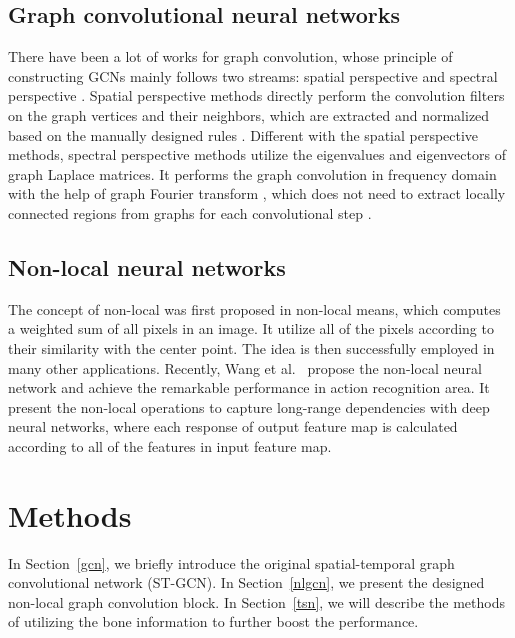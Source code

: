 \documentclass[10pt,twocolumn,letterpaper]{article}
\begin{document}
    \subsection{Graph convolutional neural networks}
    There have been a lot of works for graph convolution, whose principle of constructing GCNs mainly follows two streams: spatial perspective and spectral perspective \cite{bruna_spectral_2014,niepert_learning_2016,henaff_deep_2015,kipf_semi-supervised_2016,duvenaud_convolutional_2015,defferrard_convolutional_2016}.
Spatial perspective methods directly perform the convolution filters on the graph vertices and their neighbors, which are extracted and normalized based on the manually designed rules \cite{niepert_learning_2016}.
    Different with the spatial perspective methods, spectral perspective methods utilize the eigenvalues and eigenvectors of graph Laplace matrices. 
    It performs the graph convolution in frequency domain with the help of graph Fourier transform \cite{shuman_emerging_2013}, which does not need to extract locally connected regions from graphs for each convolutional step \cite{bruna_spectral_2014,defferrard_convolutional_2016}. 
	\subsection{Non-local neural networks}
    The concept of non-local was first proposed in non-local means, which computes a weighted sum of all pixels in an image. It utilize all of the pixels according to their similarity with the center point. The idea is then successfully employed in many other applications. Recently, Wang et al.~\cite{wang_non-local_2017} propose the non-local neural network and achieve the remarkable performance in action recognition area. It present the non-local operations to capture long-range dependencies with deep neural networks, where each response of output feature map is calculated according to all of the features in input feature map.
    
	\section{Methods}
    In Section~\ref{gcn}, we briefly introduce the original spatial-temporal graph convolutional network (ST-GCN).
In Section~\ref{nlgcn}, we present the designed non-local graph convolution block. In Section~\ref{tsn}, we will describe the methods of utilizing the bone information to further boost the performance. 
    
\end{document}
